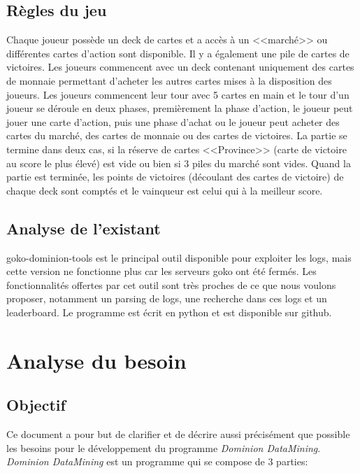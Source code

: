 \documentclass{scrreprt}
\begin{document}
\section{Règles du jeu}
Chaque joueur possède un deck de cartes et a accès à un <<marché>> ou différentes cartes d'action sont disponible. Il y a également une pile de cartes de victoires.
\newline Les joueurs commencent avec un deck contenant uniquement des cartes de monnaie permettant d'acheter les autres cartes mises à la disposition des joueurs. Les joueurs commencent leur tour avec 5 cartes en main et le tour d'un joueur se déroule en deux phases, premièrement la phase d'action, le joueur peut jouer une carte d'action, puis une phase d'achat ou le joueur peut acheter des cartes du marché, des cartes de monnaie ou des cartes de victoires.
\newline La partie se termine dans deux cas, si la réserve de cartes <<Province>> (carte de victoire au score le plus élevé) est vide ou bien si 3 piles du marché sont vides. Quand la partie est terminée, les points de victoires (découlant des cartes de victoire) de chaque deck sont comptés et le vainqueur est celui qui à la meilleur score.

\section{Analyse de l'existant}
goko-dominion-tools est le principal outil disponible pour exploiter les logs, mais cette version ne fonctionne plus car les serveurs goko ont été fermés. Les fonctionnalités offertes par cet outil sont très proches de ce que nous voulons proposer, notamment un parsing de logs, une recherche dans ces logs et un leaderboard. Le programme est écrit en python et est disponible sur github.

\chapter{Analyse du besoin}

\section{Objectif}

Ce document a pour but de clarifier et de décrire aussi précisément que possible les besoins pour le développement du programme \textit{Dominion DataMining}.\\
\textit{Dominion DataMining} est un programme qui se compose de 3 parties:
\end{document}
